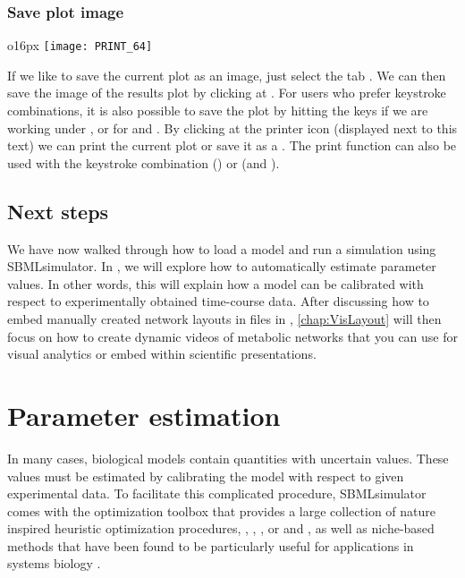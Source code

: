 \subsection{Save plot image}
\begin{wrapfigure}{o}{16px}
\vspace{\wrapfigspace}
\texttt{[image: PRINT\_64]}
\end{wrapfigure}
If we like to save the current plot as an image, just select the tab .
We can then save the image of the results plot by clicking at .
For users who prefer keystroke combinations, it is also possible to save the plot by hitting the keys  if we are working under \MacOSX, or  for \Linux and \Windows.
By clicking at the printer icon (displayed next to this text) we can print the current plot or save it as a \PDF.
The print function can also be used with the keystroke combination  (\MacOSX) or  (\Windows and \Linux).


\section{Next steps}

We have now walked through how to load a model and run a simulation using SBMLsimulator.
In , we will explore how to automatically estimate parameter values.
In other words, this will explain how a model can be calibrated with respect to experimentally obtained time-course data.
After discussing how to embed manually created network layouts in \SBML files in , \cref{chap:VisLayout} will then focus on how to create dynamic videos of metabolic networks that you can use for visual analytics or embed within scientific presentations.



\chapter{Parameter estimation}
\label{chap:ParameterEstimation}

In many cases, biological models contain quantities with uncertain values.
These values must be estimated by calibrating the model with respect to given experimental data.
To facilitate this complicated procedure, SBMLsimulator comes with the optimization toolbox \EvA that provides a large collection of nature inspired heuristic optimization procedures, \eg \ES \citep{Rechenberg1973, Schwefel1975}, \GA \citep{Holland1975}, \DE \citep{Storn96Usage}, or \PSO \citep{ClercKennedy02, Clerc2005} and \Tribes \citep{Clerc2006}, as well as niche-based methods that have been found to be particularly useful for applications in systems biology \citep{Kron09NichingGCB}.


